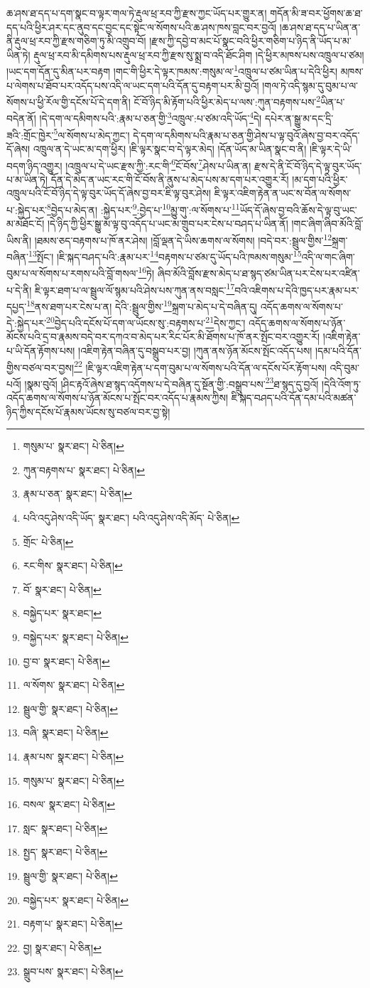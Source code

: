 ཆ་ཤས་ཐ་དད་པ་དག་སྣང་བ་ལྟར་གལ་ཏེ་རྡུལ་ཕྲ་རབ་ཀྱི་རྫས་ཀྱང་ཡོད་པར་གྱུར་ན། གདོན་མི་ཟ་བར་ཕྱོགས་ཆ་ཐ་དད་པའི་ཕྱིར་ཤར་དང་ནུབ་དང་བྱང་དང་སྟེང་ལ་སོགས་པའི་ཆ་ཤས་ཁས་བླང་བར་བྱའོ། །ཆ་ཤས་ཐ་དད་པ་ཡིན་ན་ནི་རྡུལ་ཕྲ་རབ་ཀྱི་རྫས་གཅིག་ཏུ་མི་འགྲུབ་བོ། །རྫས་ཀྱི་དབྱེ་བ་མང་པོ་སྣང་བའི་ཕྱིར་གཅིག་པ་ཉིད་ནི་ཡོད་པ་མ་ཡིན་ཏེ། རྡུལ་ཕྲ་རབ་མི་དམིགས་པས་རྡུལ་ཕྲ་རབ་ཀྱི་རྫས་སུ་སྨྲ་བ་འདི་ཐོང་ཤིག །དེ་ཕྱིར་མཁས་པས་འཁྲུལ་པ་ཙམ། །ཡང་དག་དོན་དུ་མིན་པར་བརྟག །གང་གི་ཕྱིར་དེ་ལྟར་ཁམས་:གསུམ་ལ་\footnote{གསུམ་པ་  སྣར་ཐང་།  པེ་ཅིན། }འཁྲུལ་པ་ཙམ་ཡིན་པ་དེའི་ཕྱིར། མཁས་པ་ལེགས་པ་ཐོབ་པར་འདོད་པས་འདི་ལ་ཡང་དག་པའི་དོན་དུ་བརྟག་པར་མི་བྱའོ། །གལ་ཏེ་འདི་སྙམ་དུ་བུམ་པ་ལ་སོགས་པ་ཕྱི་རོལ་གྱི་དངོས་པོ་དེ་དག་ནི། ངོ་བོ་ཉིད་མི་རྟོག་པའི་ཕྱིར་མེད་པ་ལས་:ཀུན་བརྟགས་པས་\footnote{ཀུན་བརྟགས་པ་  སྣར་ཐང་།  པེ་ཅིན། }ཡིན་པ་བདེན་ནོ། །དེ་དག་ལ་དམིགས་པའི་:རྣམ་པ་ཅན་གྱི་\footnote{རྣམ་པ་ཅན་  སྣར་ཐང་།  པེ་ཅིན། }འཁྲུལ་:པ་ཙམ་འདི་ཡོད་\footnote{པའི་འདུ་ཤེས་འདི་ཡོད་  སྣར་ཐང་། པའི་འདུ་ཤེས་འདི་མོད་  པེ་ཅིན། }དེ། དཔེར་ན་སྒྱུ་མ་དང་དྲི་ཟའི་:གྲོང་ཁྱེར་\footnote{གྲོང་  པེ་ཅིན། }ལ་སོགས་པ་མེད་ཀྱང་། དེ་དག་ལ་དམིགས་པའི་རྣམ་པ་ཅན་གྱི་ཤེས་པ་ལྟ་བུའོ་ཞེས་བྱ་བར་འདོད་དོ་ཞེས། འཁྲུལ་ན་དེ་ཡང་མ་དག་ཕྱིར། །ཇི་ལྟར་སྣང་བ་དེ་ལྟར་མེད། །དོན་ཡོད་མ་ཡིན་སྣང་བ་ནི། །ཇི་ལྟར་དེ་ཡི་བདག་ཉིད་འགྱུར། །འཁྲུལ་པ་དེ་ཡང་རྫས་ཀྱི་:རང་གི་\footnote{རང་གིས་  སྣར་ཐང་།  པེ་ཅིན། }ངོ་བོས་\footnote{བོ་  སྣར་ཐང་།  པེ་ཅིན། }ཤེས་པ་ཡིན་ན། རྫས་དེ་ནི་ངོ་བོ་ཉིད་དེ་ལྟ་བུར་ཡོད་པ་མ་ཡིན་ཏེ། དོན་དེ་མེད་ན་ཡང་རང་གི་ངོ་བོས་ནི་ནུས་པ་མེད་པས་མ་དག་པར་འགྱུར་རོ། །མ་དག་པའི་ཕྱིར་འཁྲུལ་པའི་ངོ་བོ་ཉིད་དེ་ལྟ་བུར་ཡོད་དོ་ཞེས་བྱ་བར་ཇི་ལྟ་བུར་ཤེས། ཇི་ལྟར་འཇིག་རྟེན་ན་ཡང་ས་བོན་ལ་སོགས་པ་:སྐྱེད་པར་\footnote{བསྐྱེད་པར་  སྣར་ཐང་། }བྱེད་པ་མེད་ན། :སྐྱེད་པར་\footnote{བསྐྱེད་པར་  སྣར་ཐང་།  པེ་ཅིན། }:བྱེད་པ་\footnote{བྱ་བ་  སྣར་ཐང་།  པེ་ཅིན། }མྱུ་གུ་:ལ་སོགས་པ་\footnote{ལ་སོགས་  སྣར་ཐང་།  པེ་ཅིན། }ཡོད་དོ་ཞེས་བྱ་བའི་ཆོས་དེ་ལྟ་བུ་ཡང་མ་མཐོང་ངོ། །དེ་ཉིད་ཀྱི་ཕྱིར་སྒྱུ་མ་ལྟ་བུ་འདོད་པ་ཡང་མ་གྲུབ་པར་ངེས་པ་བཤད་པ་ཡིན་ནོ། །གང་ཞིག་ཞིབ་མོའི་བློ་ཡིས་ནི། །ཐམས་ཅད་བརྟགས་པ་ཁོ་ནར་ཤེས། །བློ་ལྡན་དེ་ཡིས་ཆགས་ལ་སོགས། །བདེ་བར་:སྦྲུལ་གྱིས་\footnote{སྦྲུལ་གྱི་  སྣར་ཐང་།  པེ་ཅིན། }སྐྲག་བཞིན་\footnote{བཞི་  སྣར་ཐང་།  པེ་ཅིན། }སྤོང་། །ཇི་སྐད་བཤད་པའི་:རྣམ་པར་\footnote{རྣམ་པས་  སྣར་ཐང་།  པེ་ཅིན། }བརྟགས་པ་ཙམ་དུ་ཡོད་པའི་ཁམས་གསུམ་\footnote{གསུམ་པ་  སྣར་ཐང་།  པེ་ཅིན། }འདི་ལ་གང་ཞིག་བུམ་པ་ལ་སོགས་པ་རགས་པའི་བློ་གསལ་\footnote{བསལ་  སྣར་ཐང་།  པེ་ཅིན། }ཏེ། ཞིབ་མོའི་བློས་རྫས་མེད་པ་ཐ་སྙད་ཙམ་ཡིན་པར་ངེས་པར་འཛིན་པ་དེ་ནི། ཇི་ལྟར་ཐག་པ་ལ་སྦྲུལ་ལོ་སྙམ་པའི་ཤེས་པས་ཀུན་ནས་བསླང་\footnote{སླང་  སྣར་ཐང་།  པེ་ཅིན། }བའི་འཇིགས་པ་དེའི་ཁྱད་པར་རྣམ་པར་དཔྱད་\footnote{སྤྱད་  སྣར་ཐང་།  པེ་ཅིན། }ནས་ཐག་པར་ངེས་པ་ན། དེའི་:སྦྲུལ་གྱིས་\footnote{སྦྲུལ་གྱི་  སྣར་ཐང་།  པེ་ཅིན། }སྐྲག་པ་མེད་པ་དེ་བཞིན་དུ། འདོད་ཆགས་ལ་སོགས་པ་དེ་:སྐྱེད་པར་\footnote{བསྐྱེད་པར་  སྣར་ཐང་།  པེ་ཅིན། }བྱེད་པའི་དངོས་པོ་དག་ལ་ཡོངས་སུ་:བརྟགས་པ་\footnote{བརྟག་པ་  སྣར་ཐང་།  པེ་ཅིན། }དེས་ཀྱང་། འདོད་ཆགས་ལ་སོགས་པ་ཉོན་མོངས་པའི་དྲ་བ་རྣམས་བདེ་བར་དཀའ་བ་མེད་པར་རིང་པོར་མི་ཐོགས་པ་ཁོ་ནར་སྤོང་བར་འགྱུར་རོ། །འཇིག་རྟེན་པ་ཡི་དོན་རྟོགས་པས། །འཇིག་རྟེན་བཞིན་དུ་བསྒྲུབ་པར་བྱ། །ཀུན་ནས་ཉོན་མོངས་སྤོང་འདོད་པས། །དམ་པའི་དོན་གྱིས་བཙལ་བར་བྱས།\footnote{བྱ།  སྣར་ཐང་།  པེ་ཅིན། } །ཇི་ལྟར་འཇིག་རྟེན་པ་དག་བུམ་པ་ལ་སོགས་པའི་དོན་ལ་དངོས་པོར་རྟོག་པས། འདི་བུམ་པའོ། །སྣམ་བུའོ། །ཤིང་རྟའོ་ཞེས་ཐ་སྙད་འདོགས་པ་དེ་བཞིན་དུ་སྔོན་གྱི་:བསྒྲུབ་པས་\footnote{སྒྲུབ་པས་  སྣར་ཐང་།  པེ་ཅིན། }ཐ་སྙད་དུ་བྱའོ། །དེའི་འོག་ཏུ་འདོད་ཆགས་ལ་སོགས་པ་ཉོན་མོངས་པ་སྤོང་བར་འདོད་པ་རྣམས་ཀྱིས། ཇི་སྐད་བཤད་པའི་དོན་དམ་པའི་མཚན་ཉིད་ཀྱིས་དངོས་པོ་རྣམས་ཡོངས་སུ་བཙལ་བར་བྱ་སྟེ། 